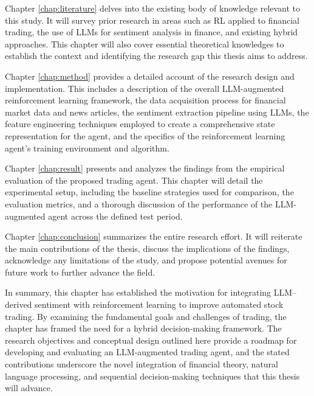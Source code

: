 Chapter \ref{chap:literature} delves into the existing body of knowledge relevant to this study. It will survey prior research in areas such as \gls{RL} applied to financial trading, the use of \gls{LLM}s for sentiment analysis in finance, and existing hybrid approaches. This chapter will also cover essential theoretical knowledges to establish the context and identifying the research gap this thesis aims to address.

Chapter \ref{chap:method} provides a detailed account of the research design and implementation. This includes a description of the overall \gls{LLM}-augmented reinforcement learning framework, the data acquisition process for financial market data and news articles, the sentiment extraction pipeline using \gls{LLM}s, the feature engineering techniques employed to create a comprehensive state representation for the agent, and the specifics of the reinforcement learning agent's training environment and algorithm.

Chapter \ref{chap:result} presents and analyzes the findings from the empirical evaluation of the proposed trading agent. This chapter will detail the experimental setup, including the baseline strategies used for comparison, the evaluation metrics, and a thorough discussion of the performance of the \gls{LLM}-augmented agent across the defined test period.

Chapter \ref{chap:conclusion} summarizes the entire research effort. It will reiterate the main contributions of the thesis, discuss the implications of the findings, acknowledge any limitations of the study, and propose potential avenues for future work to further advance the field.

In summary, this chapter has established the motivation for integrating \gls{LLM}–derived sentiment with reinforcement learning to improve automated stock trading. By examining the fundamental goals and challenges of trading, the chapter has framed the need for a hybrid decision‐making framework. The research objectives and conceptual design outlined here provide a roadmap for developing and evaluating an LLM‐augmented trading agent, and the stated contributions underscore the novel integration of financial theory, natural language processing, and sequential decision‐making techniques that this thesis will advance.
